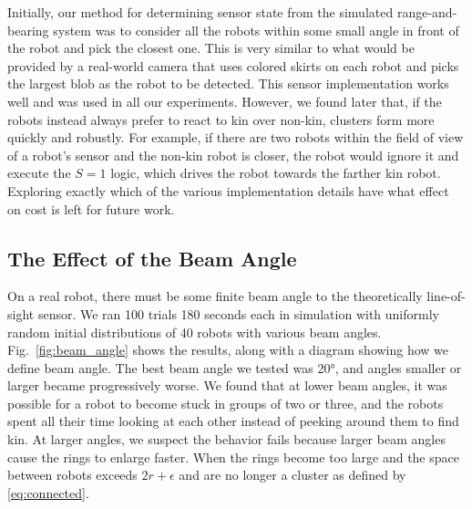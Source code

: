 \documentclass[letterpaper, 10 pt, conference]{ieeeconf}
\begin{document}
Initially, our method for determining sensor state from the simulated
range-and-bearing system was to consider all the robots within some small angle
in front of the robot and pick the closest one. This is very similar to what
would be provided by a real-world camera that uses colored skirts on each robot
and picks the largest blob as the robot to be detected. This sensor
implementation works well and was used in all our experiments. However,
we found later that, if the robots instead always prefer to react to kin over
non-kin, clusters form more quickly and robustly. For example, if there are
two robots within the field of view of a robot's sensor and the non-kin robot is
closer, the robot would ignore it and execute the $S=1$ logic, which drives the
robot towards the farther kin robot. Exploring exactly which of the various
implementation details have what effect on cost is left for future work.

\subsection{The Effect of the Beam Angle} \label{sec:aperture_angle}

On a real robot, there must be some finite beam angle to the theoretically
line-of-sight sensor. We ran 100 trials 180 seconds each in simulation with uniformly random
initial distributions of 40 robots with various beam
angles. Fig.~\ref{fig:beam_angle} shows the results, along with a diagram
showing how we define beam angle. The best beam angle we tested was \ang{20},
and angles smaller or larger became progressively worse. We found that at lower
beam angles, it was possible for a robot to become stuck in groups of two or
three, and the robots spent all their time looking at each other instead of
peeking around them to find kin. At larger angles, we suspect the behavior fails
because larger beam angles cause the rings to enlarge faster. When the rings become
too large and the space between robots exceeds $2r+\epsilon$
and are no longer a cluster as defined by \eqref{eq:connected}.
\end{document}
